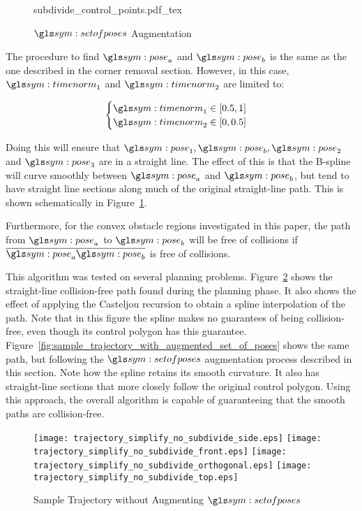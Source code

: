 		\begin{figure}[hbt]
			\centering
			\def\svgwidth{0.7\columnwidth}
			{subdivide_control_points.pdf_tex}
			\caption{$\setofposes$ Augmentation}%
			\label{fig:set_of_poses_augmentation}
		\end{figure}

		The procedure to find $\pose_a$ and $\pose_b$ is the same as the one
		described in the corner removal section. However, in this case,
		$\timenorm_1$ and $\timenorm_2$ are limited to:

		\begin{equation}
			\begin{cases}
				\timenorm_1 \in [0.5, 1] \\
				\timenorm_2 \in [0, 0.5]
			\end{cases}
		\end{equation}

		Doing this will ensure that $\pose_1, \pose_b, \pose_2$ and $\pose_3$
		are in a straight line. The effect of this is that the B-spline will
		curve smoothly between $\pose_a$ and $\pose_b$, but tend to have
		straight line sections along much of the original straight-line path.
		This is shown schematically in
		Figure~\ref{fig:set_of_poses_augmentation}.

		Furthermore, for the convex obstacle regions investigated in this paper,
		the path from $\pose_a$ to $\pose_b$ will be free of collisions if
		$\vecline{\pose_a}{\pose_b}$ is free of collisions.

		This algorithm was tested on several planning problems.
		Figure~\ref{fig:sample_trajectory_after_simplification} shows the
		straight-line collision-free path found during the planning phase. It
		also shows the effect of applying the Casteljou recursion to obtain a
		spline interpolation of the path. Note that in this figure the spline
		makes no guarantees of being collision-free, even though its control
		polygon has this guarantee.
		Figure~\ref{fig:sample_trajectory_with_augmented_set_of_poses} shows the
		same path, but following the $\setofposes$ augmentation process
		described in this section. Note how the spline retains its smooth
		curvature. It also has straight-line sections that more closely follow
		the original control polygon. Using this approach, the overall algorithm
		is capable of guaranteeing that the smooth paths are collision-free.

		\begin{figure}[hb]
			\centering
			\begin{minipage}{0.8\linewidth}
				\texttt{[image: trajectory\_simplify\_no\_subdivide\_side.eps]}
				\texttt{[image: trajectory\_simplify\_no\_subdivide\_front.eps]}
				\texttt{[image: trajectory\_simplify\_no\_subdivide\_orthogonal.eps]}
				\texttt{[image: trajectory\_simplify\_no\_subdivide\_top.eps]}
			\end{minipage}
			\caption{Sample Trajectory without Augmenting $\setofposes$}
			\label{fig:sample_trajectory_after_simplification}
		\end{figure}


